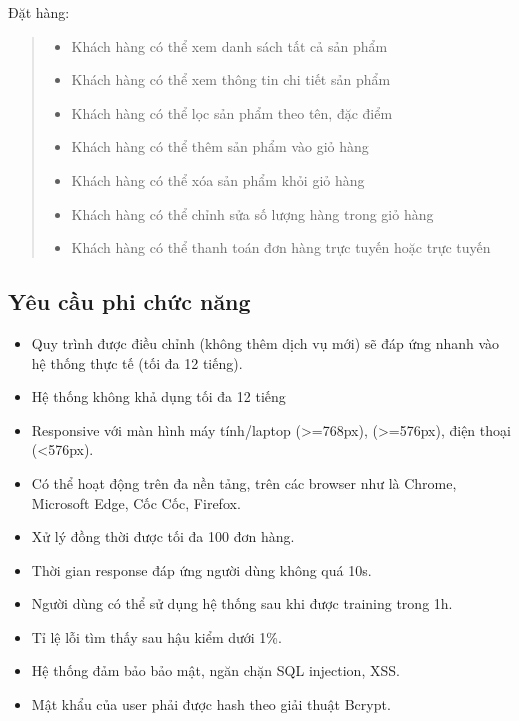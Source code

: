 Đặt hàng:
\begin{quote}
    \begin{itemize}
        \item Khách hàng có thể xem danh sách tất cả sản phẩm
        \item Khách hàng có thể xem thông tin chi tiết sản phẩm
        \item Khách hàng có thể lọc sản phẩm theo tên, đặc điểm
        \item Khách hàng có thể thêm sản phẩm vào giỏ hàng
        \item Khách hàng có thể xóa sản phẩm khỏi giỏ hàng
        \item Khách hàng có thể chỉnh sửa số lượng hàng trong giỏ hàng
        \item Khách hàng có thể thanh toán đơn hàng trực tuyến hoặc trực tuyến
    \end{itemize}
\end{quote}

\subsection{Yêu cầu phi chức năng}
\begin{itemize}
    \item Quy trình được điều chỉnh (không thêm dịch vụ mới) sẽ đáp ứng nhanh vào hệ thống thực tế (tối đa 12 tiếng).
    \item Hệ thống không khả dụng tối đa 12 tiếng
    \item Responsive với màn hình máy tính/laptop (>=768px), (>=576px), điện thoại (<576px).
    \item Có thể hoạt động trên đa nền tảng, trên các browser như là Chrome, Microsoft Edge, Cốc Cốc, Firefox.
    \item Xử lý đồng thời được tối đa 100 đơn hàng.
    \item Thời gian response đáp ứng người dùng không quá 10s.
    \item Người dùng có thể sử dụng hệ thống sau khi được training trong 1h.
    \item Tỉ lệ lỗi tìm thấy sau hậu kiểm dưới 1\%.
    \item Hệ thống đảm bảo bảo mật, ngăn chặn SQL injection, XSS.
    \item Mật khẩu của user phải được hash theo giải thuật Bcrypt.

\end{itemize}